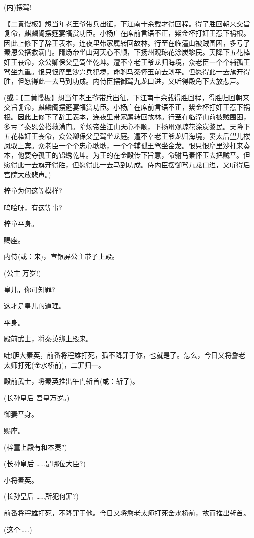(内)摆驾!

【二黄慢板】想当年老王爷带兵出征，下江南十余载才得回程。得了胜回朝来交旨复命，麒麟阁摆筵宴犒赏功臣。小杨广在席前言语不正，紫金杯打奸王惹下祸根。因此上修下了辞王表本，连夜里带家属转回故林。行至在临潼山被贼围困，多亏了秦恩公搭救满门。隋炀帝坐山河天心不顺，下扬州观琼花涂炭黎民。天降下五花棒奸王丧命，众公卿保父皇驾坐乾坤。遭不幸老王爷龙归海境，众老臣一个个辅孤王驾坐九重。恨只恨摩里沙兴兵犯境，命驸马秦怀玉前去剿平。但愿得此一去旗开得胜，但愿得此一去马到功成。内侍臣摆御驾九龙口进，又听得殿角下大放悲声。

(\textbf{或}：【二黄慢板】想当年老王爷带兵出征，下江南十余载得胜回程，得胜归回朝来交旨复命，麒麟阁摆筵宴犒赏功臣。小杨广在席前言语不正，紫金杯打奸王惹下祸根。因此上修下了辞王表本，连夜里带家属转回故林。行至在临潼山前被贼围困，多亏了秦恩公搭救满门。隋炀帝坐江山天心不顺，下扬州观琼花涂炭黎民。天降下五花棒奸王丧命，众公卿保父皇驾坐龙庭。遭不幸老王爷龙归海境，窦太后望儿楼凤驭上宾。众老臣一个个忠心耿耿，一个个辅孤王驾坐金龙。恨只恨摩里沙打来奏本，他要夺孤王的锦绣乾坤。为王的在金殿传下旨意，命驸马秦怀玉去把贼平。但愿得此一去旗开得胜，但愿得此一去马到功成。侍内臣摆御驾九龙口进，又听得后宫院大放悲声。)

梓童为何这等模样?

呜哙呀，有这等事?

梓童平身。

赐座。

内侍(或：来)，宣银屏公主带子上殿。

(公主 万岁!)

皇儿，你可知罪?

这才是皇儿的道理。

平身。

殿前武士，将秦英绑上殿来。

唗!胆大秦英，前番将程雄打死，孤不降罪于你，也就是了。怎么，今日又将詹老太师打死(金水桥前)，二罪归一。

殿前武士，将秦英推出午门斩首(或：斩了)。

(长孙皇后 吾皇万岁。)

御妻平身。

赐座。

(梓童上殿有和本奏?)

(长孙皇后 \ldots{}\ldots{}是哪位大臣?)

小将秦英。

(长孙皇后 \ldots{}\ldots{}所犯何罪?)

前番将程雄打死，不降罪于他。今日又将詹老太师打死金水桥前，故而推出斩首。

(这个\ldots{}\ldots{})

